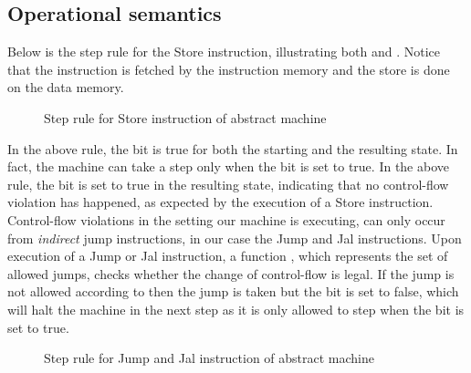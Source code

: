 \subsection{Operational semantics}\label{abstract_semantics}
Below is the step rule for the Store instruction, illustrating both \NWC and 
\NXD. Notice that the instruction is fetched by the instruction memory and
the store is done on the data memory.

\begin{figure}[!htpb]
\caption{Step rule for Store instruction of abstract machine}
\end{figure}

In the above rule, the \ok bit is true for both the starting and the
resulting state. In fact, the machine can take a step only when the \ok
bit is set to true. In the above rule, the \ok bit is set to true in the
resulting state, indicating that no control-flow violation has happened, as
expected by the execution of a Store instruction. Control-flow violations in the
\NWC setting our machine is executing, can only occur from \emph{indirect} jump
instructions, in our case the Jump and Jal instructions. Upon execution of a
Jump or Jal instruction, a function \J, which represents the set of allowed
jumps, checks whether the change of control-flow is legal. If the jump is not 
allowed according to \J then the jump is taken but the \ok bit is set to false, 
which will halt the machine in the next step as it is only allowed to step when
the \ok bit is set to true.

\begin{figure}[!htpb]
\bigskip

\caption{Step rule for Jump and Jal instruction of abstract machine}
\end{figure}

